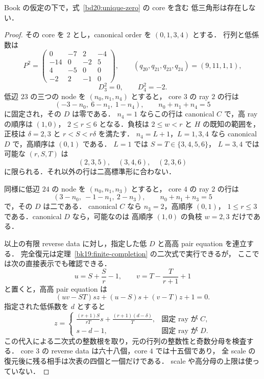 \begin{lemma}
\label{bd20:zero-core-obstruction}
Book の仮定の下で，式~\eqref{bd20:unique-zero} の core を含む
低三角形は存在しない．
\end{lemma}

\begin{proof}
その core を $2$ とし，canonical order を $(0,1,3,4)$ とする．
行列と低係数は
\[
 P^2=
 \begin{pmatrix}
 0&-7&2&-4\\
 -14&0&-2&5\\
 4&-5&0&0\\
 -2&2&-1&0
 \end{pmatrix},\qquad
 (q_{20},q_{21},q_{23},q_{24})=(9,11,1,1),
\]
\[
 D^2_3=0,\qquad D^2_4=-2.
\]
低辺 $23$ の三つの node を $(n_0,n_1,n_4)$ とすると，
core $3$ の ray $2$ の行は
\[
 (-3-n_0,\ 6-n_1,\ 1-n_4),\qquad n_0+n_1+n_4=5
\]
に固定され，その $D$ は零である．
$n_4=1$ ならこの行は canonical $C$ で，高 ray の順序は $(1,0)$，
$2\le r\le6$ となる．負枝は $2\le w<r$ と $H$ の既知の範囲を，
正枝は $\delta=2,3$ と $r<S<r\delta$ を満たす．
$n_4=L+1$，$L=1,3,4$ なら canonical $D$ で，高順序は $(0,1)$ である．
$L=1$ では $S=T\in\{3,4,5,6\}$，
$L=3,4$ では可能な $(r,S,T)$ は
\[
 (2,3,5),\quad(3,4,6),\quad(2,3,6)
\]
に限られる．それ以外の行は二高標準形に合わない．

同様に低辺 $24$ の node を $(n_0,n_1,n_3)$ とすると，
core $4$ の ray $2$ の行は
\[
 (3-n_0,\ -1-n_1,\ 2-n_3),\qquad n_0+n_1+n_3=5
\]
で，その $D$ は二である．
canonical $C$ なら $n_3=2$，高順序 $(0,1)$，
$1\le r\le3$ である．canonical $D$ なら，可能なのは
高順序 $(1,0)$ の負枝 $w=2,3$ だけである．

以上の有限 reverse data に対し，指定した低 $D$ と高高 pair equation を連立する．
完全復元は定理~\ref{bk19:finite-completion} の二次式で実行できるが，
ここでは次の直接表示でも確認できる．
\[
 u=S+\frac Sr-1,\qquad v=T-\frac T{r+1}+1
\]
と置くと，高高 pair equation は
\[
 (uv-ST)sz+(u-S)s+(v-T)z+1=0.
\]
指定された低係数を $d$ とすると
\[
 z=
 \begin{cases}
 \displaystyle\frac{(r+1)S}{rT}s+\frac{(r+1)(d-\delta)}T,
       &\text{固定 ray が }C,\\[4pt]
 s-d-1,&\text{固定 ray が }D.
 \end{cases}
\]
この代入による二次式の整数根を取り，元の行列の整数性と奇数分母を検査する．
core $3$ の reverse data は六十八個，core $4$ では十五個であり，
全 scale の復元後に残る相手は次表の四個と一個だけである．
scale や高分母の上限は使っていない．


\end{proof}
